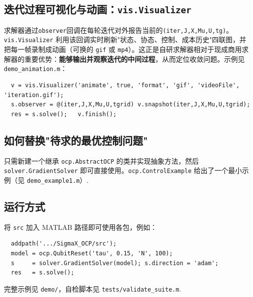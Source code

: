 \documentclass[UTF8]{article}
\numberwithin{equation}{section}
\begin{document}
        \subsection{迭代过程可视化与动画：\texttt{vis.Visualizer}}
            求解器通过\texttt{observer}回调在每轮迭代对外报告当前的\texttt{(iter,J,X,Mu,U,tg)}。\texttt{vis.Visualizer} 利用该回调实时刷新"状态、协态、控制、成本历史"四联图，并把每一帧录制成动画（可换的 \texttt{gif} 或 \texttt{mp4}）。这正是自研求解器相对于现成商用求解器的重要优势：\textbf{能够输出并观察迭代的中间过程}，从而定位收敛问题。示例见 \texttt{demo\_animation.m}：
            \begin{lstlisting}
  v = vis.Visualizer('animate', true, 'format', 'gif', 'videoFile', 'iteration.gif');
  s.observer = @(iter,J,X,Mu,U,tgrid) v.snapshot(iter,J,X,Mu,U,tgrid);
  res = s.solve();   v.finish();
            \end{lstlisting}
        \subsection{如何替换"待求的最优控制问题"}
            只需新建一个继承 \texttt{ocp.AbstractOCP} 的类并实现抽象方法，然后 \texttt{solver.GradientSolver} 即可直接使用。\texttt{ocp.ControlExample} 给出了一个最小示例（见 \texttt{demo\_example1.m}）.
        \subsection{运行方式}
            将 \texttt{src} 加入 MATLAB 路径即可使用各包，例如：
            \begin{lstlisting}
  addpath('.../SigmaX_OCP/src');
  model = ocp.QubitReset('tau', 0.15, 'N', 100);
  s     = solver.GradientSolver(model); s.direction = 'adam';
  res   = s.solve();
            \end{lstlisting}
            完整示例见 \texttt{demo/}，自检脚本见 \texttt{tests/validate\_suite.m}.
\end{document}
